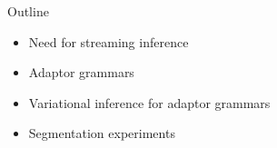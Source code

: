 \begin{frame}{Outline}

  \begin{itemize}
    \item Need for streaming inference
    \item Adaptor grammars
    \item Variational inference for adaptor grammars
    \item Segmentation experiments
  \end{itemize}

\end{frame}



